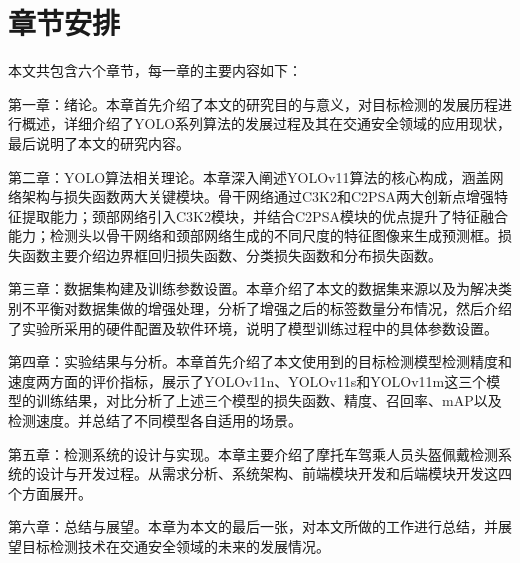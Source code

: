 \section{章节安排}
本文共包含六个章节，每一章的主要内容如下：

第一章：绪论。本章首先介绍了本文的研究目的与意义，对目标检测的发展历程进行概述，详细介绍了YOLO系列算法的发展过程及其在交通安全领域的应用现状，最后说明了本文的研究内容。

第二章：YOLO算法相关理论。本章深入阐述YOLOv11算法的核心构成，涵盖网络架构与损失函数两大关键模块。骨干网络通过C3K2和C2PSA两大创新点增强特征提取能力；颈部网络引入C3K2模块，并结合C2PSA模块的优点提升了特征融合能力；检测头以骨干网络和颈部网络生成的不同尺度的特征图像来生成预测框。损失函数主要介绍边界框回归损失函数、分类损失函数和分布损失函数。

第三章：数据集构建及训练参数设置。本章介绍了本文的数据集来源以及为解决类别不平衡对数据集做的增强处理，分析了增强之后的标签数量分布情况，然后介绍了实验所采用的硬件配置及软件环境，说明了模型训练过程中的具体参数设置。

第四章：实验结果与分析。本章首先介绍了本文使用到的目标检测模型检测精度和速度两方面的评价指标，展示了YOLOv11n、YOLOv11s和YOLOv11m这三个模型的训练结果，对比分析了上述三个模型的损失函数、精度、召回率、mAP以及检测速度。并总结了不同模型各自适用的场景。

第五章：检测系统的设计与实现。本章主要介绍了摩托车驾乘人员头盔佩戴检测系统的设计与开发过程。从需求分析、系统架构、前端模块开发和后端模块开发这四个方面展开。

第六章：总结与展望。本章为本文的最后一张，对本文所做的工作进行总结，并展望目标检测技术在交通安全领域的未来的发展情况。
